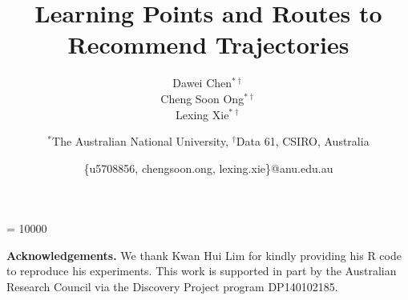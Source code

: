 \documentclass{sig-alternate-05-2015}
\begin{document}
\widowpenalty = 10000

\title{Learning Points and Routes to Recommend Trajectories}

\author{
    \alignauthor Dawei Chen$^{*\dagger}$\\
    \alignauthor Cheng Soon Ong$^{*\dagger}$\\
    \alignauthor Lexing Xie$^{*\dagger}$\\
    \and
    $^*$The Australian National University, $^\dagger$Data 61, CSIRO, Australia\\
    \and
    \{u5708856, chengsoon.ong, lexing.xie\}@anu.edu.au
}


\maketitle

\begin{abstract}

\end{abstract}

\printccsdesc  %








\vspace{0.5em}
\noindent
\textbf{Acknowledgements.}
We thank Kwan Hui Lim for kindly providing his R code to reproduce his experiments.
This work is supported in part by the Australian Research Council via the Discovery Project program DP140102185. 


{\small


}

%
\end{document}
